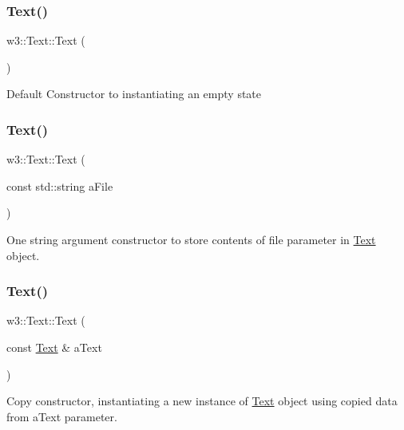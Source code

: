 \subsubsection{\texorpdfstring{Text()}{Text()}\hspace{0.1cm}{\footnotesize\ttfamily [1/4]}}
{\footnotesize\ttfamily w3\+::\+Text\+::\+Text (\begin{DoxyParamCaption}{ }\end{DoxyParamCaption})}

Default Constructor to instantiating an empty state \mbox{\label{classw3_1_1Text_aa81c2b7009d35ff78c0e0937093ef7fd}} 
\subsubsection{\texorpdfstring{Text()}{Text()}\hspace{0.1cm}{\footnotesize\ttfamily [2/4]}}
{\footnotesize\ttfamily w3\+::\+Text\+::\+Text (\begin{DoxyParamCaption}\item[{const std\+::string}]{a\+File }\end{DoxyParamCaption})}

One string argument constructor to store contents of file parameter in \mbox{\hyperlink{classw3_1_1Text}{Text}} object. \mbox{\label{classw3_1_1Text_a31ae34f225b1ba9996030fb9654b1c99}} 
\subsubsection{\texorpdfstring{Text()}{Text()}\hspace{0.1cm}{\footnotesize\ttfamily [3/4]}}
{\footnotesize\ttfamily w3\+::\+Text\+::\+Text (\begin{DoxyParamCaption}\item[{const \mbox{\hyperlink{classw3_1_1Text}{Text}} \&}]{a\+Text }\end{DoxyParamCaption})}

Copy constructor, instantiating a new instance of \mbox{\hyperlink{classw3_1_1Text}{Text}} object using copied data from a\+Text parameter. \mbox{\label{classw3_1_1Text_a87c28dfc63a709ead728be4a6d3308b4}} 
